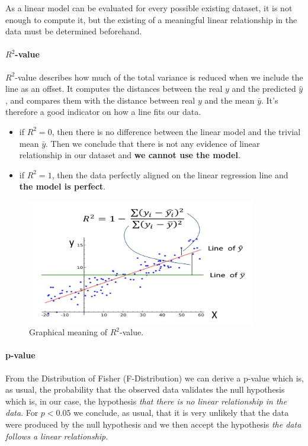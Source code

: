 As a linear model can be evaluated for every possible existing dataset, it is not enough to compute it, but the existing of a meaningful linear relationship in the data must be determined beforehand.

\paragraph{$R^2$-value}

$R^2$-value describes how much of the total variance is reduced when we include the line as an offset. It computes the distances between the real $y$ and the predicted $\hat{y}$, and compares them with the distance between real $y$ and the mean $\bar{y}$. It's therefore a good indicator on how a line fits our data.

\begin{itemize}
\item if $R^2 = 0$, then there is no difference between the linear model and the trivial mean $\bar{y}$. Then we conclude that there is not any evidence of linear relationship in our dataset and \textbf{we cannot use the model}.
\item if $R^2 = 1$, then the data perfectly aligned on the linear regression line and \textbf{the model is perfect}.
\end{itemize}

\begin{figure}[H]%
 \centering
 \includegraphics[width=10cm]{./img/07/r_2.png}
 \caption{\label{pic:r_2} Graphical meaning of $R^2$-value.}
\end{figure}


\paragraph{p-value}

From the Distribution of Fisher (F-Distribution) we can derive a p-value which is, as usual, the probability that the observed data validates the null hypothesis which is, in our case, the hypothesis \textit{that there is no linear relationship in the data}. For $p < 0.05$ we conclude, as usual, that it is very unlikely that the data were produced by the null hypothesis and we then accept the hypothesis \textit{the data follows a linear relationship}.














